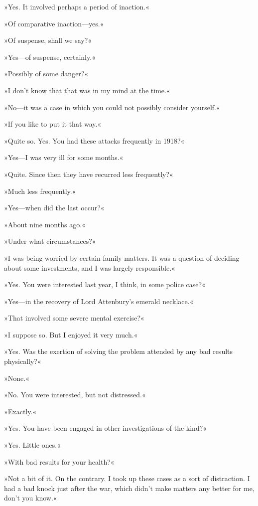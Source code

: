 »Yes. It involved perhaps a period of inaction.«

»Of comparative inaction\allowbreak---\allowbreak yes.«

»Of suspense, shall we say?«

»Yes\allowbreak---\allowbreak of suspense, certainly.«

»Possibly of some danger?«

»I don't know that that was in my mind at the time.«

»No\allowbreak---\allowbreak it was a case in which you could not possibly consider yourself.«

»If you like to put it that way.«

»Quite so. Yes. You had these attacks frequently in 1918?«

»Yes\allowbreak---\allowbreak I was very ill for some months.«

»Quite. Since then they have recurred less frequently?«

»Much less frequently.«

»Yes\allowbreak---\allowbreak when did the last occur?«

»About nine months ago.«

»Under what circumstances?«

»I was being worried by certain family matters. It was a question of deciding about some investments, and I was largely responsible.«

»Yes. You were interested last year, I think, in some police case?«

»Yes\allowbreak---\allowbreak in the recovery of Lord Attenbury's emerald necklace.«

»That involved some severe mental exercise?«

»I suppose so. But I enjoyed it very much.«

»Yes. Was the exertion of solving the problem attended by any bad results physically?«

»None.«

»No. You were interested, but not distressed.«

»Exactly.«

»Yes. You have been engaged in other investigations of the kind?«

»Yes. Little ones.«

»With bad results for your health?«

»Not a bit of it. On the contrary. I took up these cases as a sort of distraction. I had a bad knock just after the war, which didn't make matters any better for me, don't you know.«

